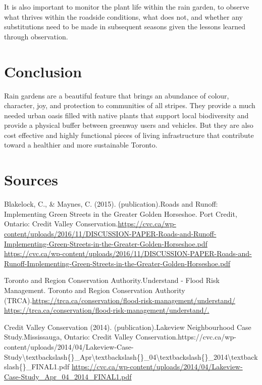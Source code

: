 \documentclass[letter]{ourGreenwayBrand}
\begin{document}
It is also important to monitor the plant life within the rain garden, to observe what thrives within the roadside conditions, what does not, and whether any substitutions need to be made in subsequent seasons given the lessons learned through observation.

\section{Conclusion}
Rain gardens are a beautiful feature that brings an abundance of colour, character, joy, and protection to communities of all stripes. They provide a much needed urban oasis filled with native plants that support local biodiversity and provide a physical buffer between greenway users and vehicles. But they are also cost effective and highly functional pieces of living infrastructure that contribute toward a healthier and more sustainable Toronto.

\newpage
\section{Sources}

\hspace{1em}Blakelock, C., \& Maynes, C. (2015). (publication).Roads and Runoff: Implementing Green Streets in the Greater Golden Horseshoe. Port Credit, Ontario: Credit Valley Conservation.\url{https://cvc.ca/wp-content/uploads/2016/11/DISCUSSION-PAPER-Roads-and-Runoff-Implementing-Green-Streets-in-the-Greater-Golden-Horseshoe.pdf} \url{https://cvc.ca/wp-content/uploads/2016/11/DISCUSSION-PAPER-Roads-and-Runoff-Implementing-Green-Streets-in-the-Greater-Golden-Horseshoe.pdf}

\hspace{1em}Toronto and Region Conservation Authority.Understand - Flood Risk Management. Toronto and Region Conservation Authority (TRCA).\url{https://trca.ca/conservation/flood-risk-management/understand/} \url{https://trca.ca/conservation/flood-risk-management/understand/.}

\hspace{1em}Credit Valley Conservation (2014). (publication).Lakeview Neighbourhood Case Study.Mississauga, Ontario: Credit Valley Conservation.https://cvc.ca/wp-content/uploads/2014/04/Lakeview-Case-Study\textbackslash{}textbackslash\{\}\_Apr\textbackslash{}textbackslash\{\}\_04\textbackslash{}textbackslash\{\}\_2014\textbackslash{}textbackslash\{\}\_FINAL1.pdf \url{https://cvc.ca/wp-content/uploads/2014/04/Lakeview-Case-Study_Apr_04_2014_FINAL1.pdf}
\end{document}
